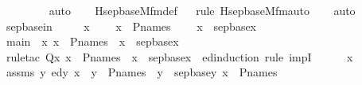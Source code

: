 \begin{isabellebody}
\ \ \ \ \ \ \ \isamarkupfalse%
\ auto{\isacharbrackleft}{\kern0pt}{}{\isacharbrackright}{\kern0pt}\isanewline
\ \ \isamarkupfalse%
\ Hsep{\isacharunderscore}{\kern0pt}base{\isacharunderscore}{\kern0pt}M{\isacharunderscore}{\kern0pt}fm{\isacharunderscore}{\kern0pt}def\isanewline
\ \ \isamarkupfalse%
{\isacharparenleft}{\kern0pt}rule\ Hsep{\isacharunderscore}{\kern0pt}base{\isacharunderscore}{\kern0pt}M{\isacharunderscore}{\kern0pt}fm{\isacharunderscore}{\kern0pt}auto{\isacharparenright}{\kern0pt}\isanewline
\ \ \isamarkupfalse%
\ auto%
\endisatagproof
{\isafoldproof}%
%
\isadelimproof
\isanewline
%
\endisadelimproof
\isanewline
{}\isamarkupfalse%
\ sep{\isacharunderscore}{\kern0pt}base{\isacharunderscore}{\kern0pt}in\ {\isacharcolon}{\kern0pt}\ \isanewline
\ \ \ x\ \isanewline
\ \ \ {\isachardoublequoteopen}x\ {\isasymin}\ P{\isacharunderscore}{\kern0pt}names{\isachardoublequoteclose}\ \isanewline
\ \ \ {\isachardoublequoteopen}x\ {\isasymin}\ sep{\isacharunderscore}{\kern0pt}base{\isacharparenleft}{\kern0pt}x{\isacharparenright}{\kern0pt}{\isachardoublequoteclose}\ \isanewline
%
\isadelimproof
%
\endisadelimproof
%
\isatagproof
{}\isamarkupfalse%
\ {\isacharminus}{\kern0pt}\ \isanewline
\ \ \isamarkupfalse%
\ main\ {\isacharcolon}{\kern0pt}\ {\isachardoublequoteopen}{\isasymAnd}x{\isachardot}{\kern0pt}\ x\ {\isasymin}\ P{\isacharunderscore}{\kern0pt}names\ {\isasymlongrightarrow}\ x\ {\isasymin}\ sep{\isacharunderscore}{\kern0pt}base{\isacharparenleft}{\kern0pt}x{\isacharparenright}{\kern0pt}{\isachardoublequoteclose}\isanewline
\ \ \isamarkupfalse%
\ {\isacharparenleft}{\kern0pt}rule{\isacharunderscore}{\kern0pt}tac\ Q{\isacharequal}{\kern0pt}{\isachardoublequoteopen}{\isasymlambda}x{\isachardot}{\kern0pt}\ x\ {\isasymin}\ P{\isacharunderscore}{\kern0pt}names\ {\isasymlongrightarrow}\ x\ {\isasymin}\ sep{\isacharunderscore}{\kern0pt}base{\isacharparenleft}{\kern0pt}x{\isacharparenright}{\kern0pt}{\isachardoublequoteclose}\ \ ed{\isacharunderscore}{\kern0pt}induction{\isacharcomma}{\kern0pt}\ rule\ impI{\isacharparenright}{\kern0pt}\isanewline
\ \ \ \ \isamarkupfalse%
\ x\ \isamarkupfalse%
\ assms{\isacharcolon}{\kern0pt}\ {\isachardoublequoteopen}{\isacharparenleft}{\kern0pt}{\isasymAnd}y{\isachardot}{\kern0pt}\ ed{\isacharparenleft}{\kern0pt}y{\isacharcomma}{\kern0pt}\ x{\isacharparenright}{\kern0pt}\ {\isasymLongrightarrow}\ y\ {\isasymin}\ P{\isacharunderscore}{\kern0pt}names\ {\isasymlongrightarrow}\ y\ {\isasymin}\ sep{\isacharunderscore}{\kern0pt}base{\isacharparenleft}{\kern0pt}y{\isacharparenright}{\kern0pt}{\isacharparenright}{\kern0pt}{\isachardoublequoteclose}\ {\isachardoublequoteopen}x\ {\isasymin}\ P{\isacharunderscore}{\kern0pt}names{\isachardoublequoteclose}\ \isanewline

\end{isabellebody}
